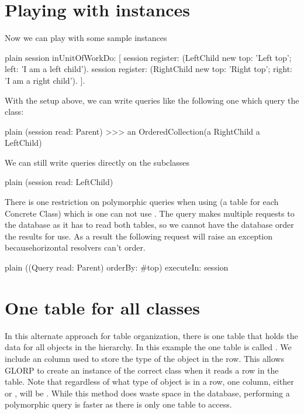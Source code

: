 \documentclass[10pt,twoside,english]{_support/latex/sbabook/sbabook}
\begin{document}
\section{Playing with instances}
Now we can play with some sample instances

\begin{displaycode}{plain}
session inUnitOfWorkDo: [
	session register: (LeftChild new top: 'Left top'; left: 'I am a left child').
	session register: (RightChild new top: 'Right top'; right: 'I am a right child').
].
\end{displaycode}

With the setup above, we can write queries like the following one which 
query the  class:

\begin{displaycode}{plain}
(session read: Parent) 
>>> an OrderedCollection(a RightChild a LeftChild)
\end{displaycode}

We can still write queries directly on the subclasses

\begin{displaycode}{plain}
(session read: LeftChild)
\end{displaycode}

There is one restriction on polymorphic queries when using
 (a table for each Concrete Class) which is one can
not use . The query makes multiple requests to the database as it
has to read both tables, so we cannot have the database order the results
for use. As a result the following request will raise an exception becausehorizontal resolvers can't order.

\begin{displaycode}{plain}
((Query read: Parent) orderBy: #top) executeIn: session
\end{displaycode}
\section{One table for all classes}
In this alternate approach for table  organization, there is one table that holds the data
for all objects in the hierarchy. In this example the one table is called
. We include an  column used to store the type
of the object in the row.	This allows GLORP to create an instance of the
correct class when it reads a row in the table. Note
that regardless of what type of object is in a row, one column,
either  or , will be .
While this method does waste space in the database, performing a polymorphic
query is faster as there is only one table to access.
\end{document}
